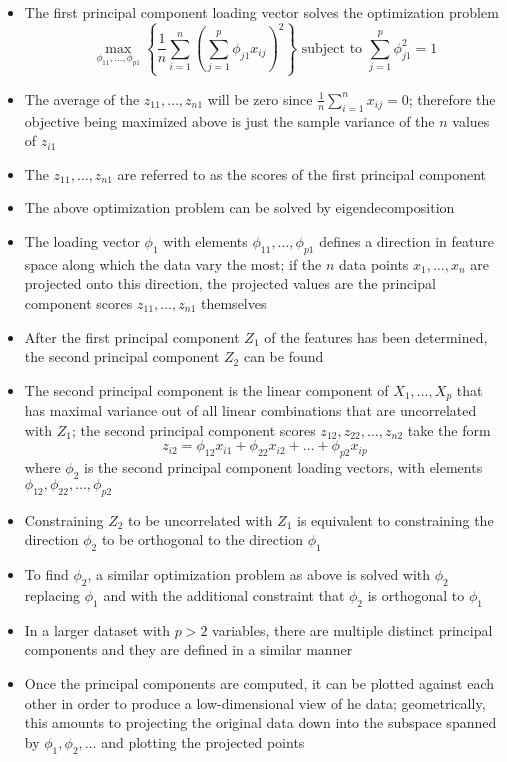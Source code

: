 \documentclass[12pt]{article}
\begin{document}
\begin{itemize}
\item The first principal component loading vector solves the optimization problem $$ \max_{\phi_{11},\dots,\phi_{p1}} \left\{ \frac{1}{n} \sum_{i=1}^n \left( \sum_{j=1}^p \phi_{j1}x_{ij}\right)^2\right\} \text{ subject to } \sum_{j=1}^p \phi_{j1}^2 = 1 $$ 
\item The average of the $z_{11},\dots,z_{n1}$ will be zero since $\frac{1}{n} \sum_{i=1}^n x_{ij} = 0$; therefore the objective being maximized above is just the sample variance of the $n$ values of $z_{i1}$
\item The $z_{11},\dots,z_{n1}$ are referred to as the scores of the first principal component
\item The above optimization problem can be solved by eigendecomposition 
\item The loading vector $\phi_1$ with elements $\phi_{11},\dots,\phi_{p1}$ defines a direction in feature space along which the data vary the most; if the $n$ data points $x_1,\dots,x_n$ are projected onto this direction, the projected values are the principal component scores $z_{11},\dots,z_{n1}$ themselves 
\item After the first principal component $Z_1$ of the features has been determined, the second principal component $Z_2$ can be found
\item The second principal component is the linear component of $X_1,\dots,X_p$ that has maximal variance out of all linear combinations that are uncorrelated with $Z_1$; the second principal component scores $z_{12},z_{22},\dots,z_{n2}$ take the form $$ z_{i2} = \phi_{12}x_{i1} + \phi_{22}x_{i2} + \dots + \phi_{p2}x_{ip} $$ where $\phi_2$ is the second principal component loading vectors, with elements $\phi_{12},\phi_{22},\dots,\phi_{p2}$ 
\item Constraining $Z_2$ to be uncorrelated with $Z_1$ is equivalent to constraining the direction $\phi_2$ to be orthogonal to the direction $\phi_1$ 
\item To find $\phi_2$, a similar optimization problem as above is solved with $\phi_2$ replacing $\phi_1$ and with the additional constraint that $\phi_2$ is orthogonal to $\phi_1$ 
\item In a larger dataset with $p>2$ variables, there are multiple distinct principal components and they are defined in a similar manner
\item Once the principal components are computed, it can be plotted against each other in order to produce a low-dimensional view of he data; geometrically, this amounts to projecting the original data down into the subspace spanned by $\phi_1,\phi_2,\dots$ and plotting the projected points 

\end{itemize}
\end{document}
